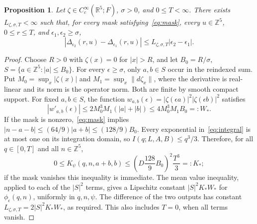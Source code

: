 \documentclass[11pt]{article}
\newtheorem{proposition}[theorem]{Proposition}
\newcommand{\R}{\mathbb R}
\newcommand{\Z}{\mathbb Z}
\begin{document}
\begin{proposition}\label{prop:correction}
Let $\zeta\in C_c^\infty(\R^5;F)$, $\sigma>0$, and $0\le T<\infty$.
There exists $L_{\zeta,\sigma,T}<\infty$ such that, for every mask
satisfying~\eqref{eq:mask}, every $u\in\Z^5$, $0\le r\le T$,
and $\epsilon_1,\epsilon_2\ge\sigma$,
\[
 |\Delta_{\epsilon_2}(r,u)-\Delta_{\epsilon_1}(r,u)|
 \le L_{\zeta,\sigma,T}|\epsilon_2-\epsilon_1|.
\]
\end{proposition}
\begin{proof}
Choose $R>0$ with $\zeta(x)=0$ for $|x|>R$, and let
$B_0=R/\sigma$, $S=\{a\in\Z^5:|a|\le B_0\}$.
For every $\epsilon\ge\sigma$, only $a,b\in S$ occur in the
reindexed sum. Put
$M_0=\sup_x|\zeta(x)|$ and $M_1=\sup_x\|d\zeta_x\|$,
where the derivative is real-linear and its norm is the operator norm.
Both are finite by smooth compact support.
For fixed $a,b\in S$, the function
$w_{a,b}(\epsilon)=|\zeta(\epsilon a)|^2|\zeta(\epsilon b)|^2$
satisfies
\[
 |w'_{a,b}(\epsilon)|
 \le2M_0^3M_1(|a|+|b|)\le4M_0^3M_1B_0=:W_*.
\]
If the mask is nonzero,~\eqref{eq:mask} implies
$|n-a-b|\le(64/9)|a+b|\le(128/9)B_0$.
Every exponential in~\eqref{eq:integral} is at most one on its
integration domain, so $I(q;L,A,B)\le q^3/3$.
Therefore, for all $q\in[0,T]$ and all $n\in\Z^5$,
\[
 0\le K_\psi(q,n,a+b,b)
 \le\left(D\frac{128}{9}B_0\right)^2\frac{T^3}{3}=:K_*;
\]
if the mask vanishes this inequality is immediate.
The mean value inequality, applied to each of the $|S|^2$ terms,
gives a Lipschitz constant $|S|^2K_*W_*$ for
$\phi_\epsilon(q,n)$, uniformly in $q,n,\psi$.
The difference of the two outputs has constant
$L_{\zeta,\sigma,T}=2|S|^2K_*W_*$, as required.
This also includes $T=0$, when all terms vanish.
\end{proof}
\end{document}
